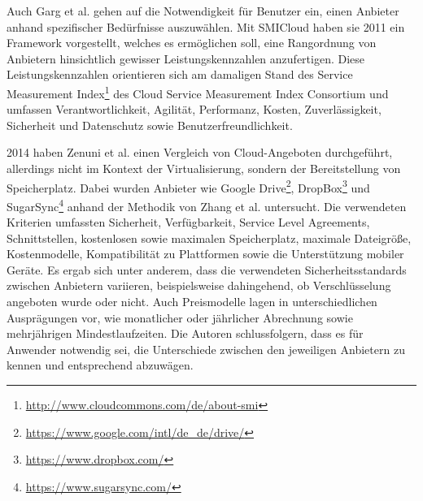 %

Auch Garg et al. gehen auf die Notwendigkeit für Benutzer ein, einen Anbieter anhand spezifischer Bedürfnisse auszuwählen. 
Mit SMICloud haben sie 2011 ein Framework vorgestellt\cite{garg2011}, welches es ermöglichen soll, eine Rangordnung von Anbietern hinsichtlich gewisser Leistungskennzahlen anzufertigen. 
Diese Leistungskennzahlen orientieren sich am damaligen Stand des Service Measurement Index\footnote{\url{http://www.cloudcommons.com/de/about-smi}} des Cloud Service Measurement Index Consortium und umfassen Verantwortlichkeit, Agilität, Performanz, Kosten, Zuverlässigkeit, Sicherheit und Datenschutz sowie Benutzerfreundlichkeit.

%

2014 haben Zenuni et al. einen Vergleich von Cloud-Angeboten durchgeführt, allerdings nicht im Kontext der Virtualisierung, sondern der Bereitstellung von Speicherplatz\cite{zenuni2014}. 
Dabei wurden Anbieter wie Google Drive\footnote{\url{https://www.google.com/intl/de_de/drive/}}, DropBox\footnote{\url{https://www.dropbox.com/}} und SugarSync\footnote{\url{https://www.sugarsync.com/}} anhand der Methodik von Zhang et al.\cite{zhang2013} untersucht. 
Die verwendeten Kriterien umfassten Sicherheit, Verfügbarkeit, Service Level Agreements, Schnittstellen, kostenlosen sowie maximalen Speicherplatz, maximale Dateigröße, Kostenmodelle, Kompatibilität zu Plattformen sowie die Unterstützung mobiler Geräte. 
Es ergab sich unter anderem, dass die verwendeten Sicherheitsstandards zwischen Anbietern variieren, beispielsweise dahingehend, ob Verschlüsselung angeboten wurde oder nicht. 
Auch Preismodelle lagen in unterschiedlichen Ausprägungen vor, wie monatlicher oder jährlicher Abrechnung sowie mehrjährigen Mindestlaufzeiten. 
Die Autoren schlussfolgern, dass es für Anwender notwendig sei, die Unterschiede zwischen den jeweiligen Anbietern zu kennen und entsprechend abzuwägen. 
